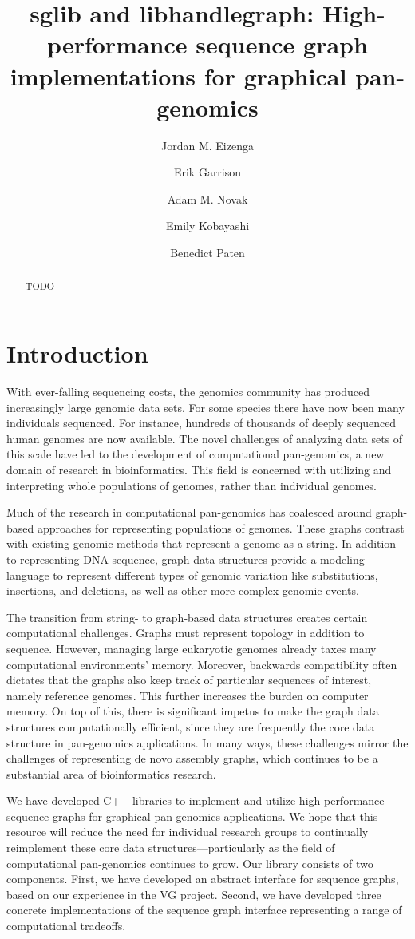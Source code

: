 \documentclass{article}
\title{sglib and libhandlegraph: High-performance sequence graph implementations for graphical pan-genomics}
\author{Jordan M. Eizenga \and Erik Garrison \and Adam M. Novak \and Emily Kobayashi \and Benedict Paten}
\begin{document}
\maketitle

\begin{abstract}
    TODO
\end{abstract}

\section{Introduction}

With ever-falling sequencing costs, the genomics community has produced increasingly large genomic data sets. For some species there have now been many individuals sequenced. For instance, hundreds of thousands of deeply sequenced human genomes are now available. The novel challenges of analyzing data sets of this scale have led to the development of computational pan-genomics, a new domain of research in bioinformatics. This field is concerned with utilizing and interpreting whole populations of genomes, rather than individual genomes.

Much of the research in computational pan-genomics has coalesced around graph-based approaches for representing populations of genomes. These graphs  contrast with existing genomic methods that represent a genome as a string. In addition to representing DNA sequence, graph data structures provide a modeling language to represent different types of genomic variation like substitutions, insertions, and deletions, as well as other more complex genomic events. 

The transition from string- to graph-based data structures creates certain computational challenges. Graphs must represent topology in addition to sequence. However, managing large eukaryotic genomes already taxes many computational environments' memory. Moreover, backwards compatibility often dictates that the graphs also keep track of particular sequences of interest, namely reference genomes. This further increases the burden on computer memory. On top of this, there is significant impetus to make the graph data structures computationally efficient, since they are frequently the core data structure in pan-genomics applications. In many ways, these challenges mirror the challenges of representing de novo assembly graphs, which continues to be a substantial area of bioinformatics research. 

We have developed C++ libraries to implement and utilize high-performance sequence graphs for graphical pan-genomics applications. We hope that this resource will reduce the need for individual research groups to continually reimplement these core data structures---particularly as the field of computational pan-genomics continues to grow. Our library consists of two components. First, we have developed an abstract interface for sequence graphs, based on our experience in the VG project. Second, we have developed three concrete implementations of the sequence graph interface representing a range of computational tradeoffs. 
\end{document}

